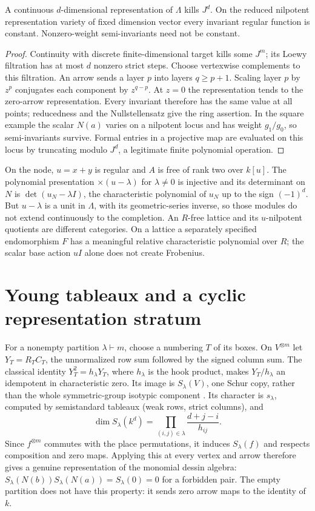\begin{proposition}\label{thm:nilpotent}
A continuous $d$-dimensional representation of $\Lambda$ kills $J^d$. On the reduced nilpotent representation variety of fixed dimension vector every invariant regular function is constant. Nonzero-weight semi-invariants need not be constant.
\end{proposition}
\begin{proof}
Continuity with discrete finite-dimensional target kills some $J^m$; its Loewy filtration has at most $d$ nonzero strict steps. Choose vertexwise complements to this filtration. An arrow sends a layer $p$ into layers $q\ge p+1$. Scaling layer $p$ by $z^p$ conjugates each component by $z^{q-p}$. At $z=0$ the representation tends to the zero-arrow representation. Every invariant therefore has the same value at all points; reducedness and the Nullstellensatz give the ring assertion. In the square example the scalar $N(a)$ varies on a nilpotent locus and has weight $g_1/g_0$, so semi-invariants survive. Formal entries in a projective map are evaluated on this locus by truncating modulo $J^d$, a legitimate finite polynomial operation.
\end{proof}
On the node, $u=x+y$ is regular and $A$ is free of rank two over $k[u]$. The polynomial presentation $\times(u-\lambda)$ for $\lambda\ne0$ is injective and its determinant on $N$ is $\det(u_N-\lambda I)$, the characteristic polynomial of $u_N$ up to the sign $(-1)^d$. But $u-\lambda$ is a unit in $\Lambda$, with its geometric-series inverse, so those modules do not extend continuously to the completion. An $R$-free lattice and its $u$-nilpotent quotients are different categories. On a lattice a separately specified endomorphism $F$ has a meaningful relative characteristic polynomial over $R$; the scalar base action $uI$ alone does not create Frobenius.

\section{Young tableaux and a cyclic representation stratum}
For a nonempty partition $\lambda\vdash m$, choose a numbering $T$ of its boxes. On $V^{\otimes m}$ let $Y_T=R_TC_T$, the unnormalized row sum followed by the signed column sum. The classical identity $Y_T^2=h_\lambda Y_T$, where $h_\lambda$ is the hook product, makes $Y_T/h_\lambda$ an idempotent in characteristic zero. Its image is $S_\lambda(V)$, one Schur copy, rather than the whole symmetric-group isotypic component \cite{Etingof,SchurComplexes}. Its character is $s_\lambda$, computed by semistandard tableaux (weak rows, strict columns), and
\[
 \dim S_\lambda(k^d)=\prod_{(i,j)\in\lambda}\frac{d+j-i}{h_{ij}}.
\]
Since $f^{\otimes m}$ commutes with the place permutations, it induces $S_\lambda(f)$ and respects composition and zero maps. Applying this at every vertex and arrow therefore gives a genuine representation of the monomial dessin algebra: $S_\lambda(N(b))S_\lambda(N(a))=S_\lambda(0)=0$ for a forbidden pair. The empty partition does not have this property: it sends zero arrow maps to the identity of $k$.

